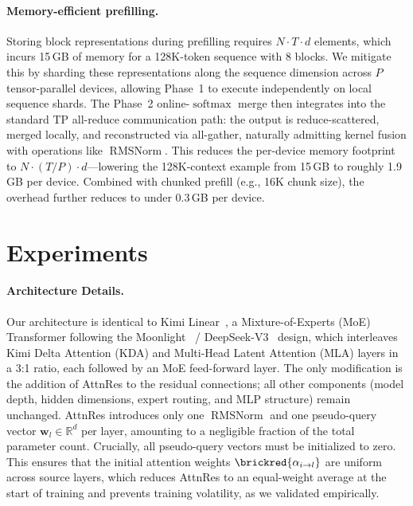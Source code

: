 



\paragraph{Memory-efficient prefilling.}
Storing block representations during prefilling requires $N \cdot T \cdot d$ elements, which incurs 15\,GB of memory for a 128K-token sequence with 8 blocks. We mitigate this by sharding these representations along the sequence dimension across $P$ tensor-parallel devices, allowing Phase~1 to execute independently on local sequence shards. The Phase~2 online-$\operatorname{softmax}$ merge then integrates into the standard TP all-reduce communication path: the output is reduce-scattered, merged locally, and reconstructed via all-gather, naturally admitting kernel fusion with operations like $\operatorname{RMSNorm}$. This reduces the per-device memory footprint to $N \cdot (T/P) \cdot d$---lowering the 128K-context example from 15\,GB to roughly 1.9\,GB per device. Combined with chunked prefill (e.g., 16K chunk size), the overhead further reduces to under 0.3\,GB per device.




\section{Experiments}
\label{sec:exp}


\paragraph{Architecture Details.}
Our architecture is identical to Kimi Linear~\citep{zhang2025kimi}, a Mixture-of-Experts (MoE) Transformer following the Moonlight~\citep{liu-2025-moonlight} / DeepSeek-V3~\citep{deepseekaiv3} design, which interleaves Kimi Delta Attention (KDA) and Multi-Head Latent Attention (MLA) layers in a 3:1 ratio, each followed by an MoE feed-forward layer.
The only modification is the addition of AttnRes to the residual connections; all other components (model depth, hidden dimensions, expert routing, and MLP structure) remain unchanged.
AttnRes introduces only one $\operatorname{RMSNorm}$ and one pseudo-query vector $\bm{w}_l \in \mathbb{R}^d$ per layer, amounting to a negligible fraction of the total parameter count. Crucially, all pseudo-query vectors must be initialized to zero. This ensures that the initial attention weights $\brickred{\alpha_{i \to l}}$ are uniform across source layers, which reduces AttnRes to an equal-weight average at the start of training and prevents training volatility, as we validated empirically.


